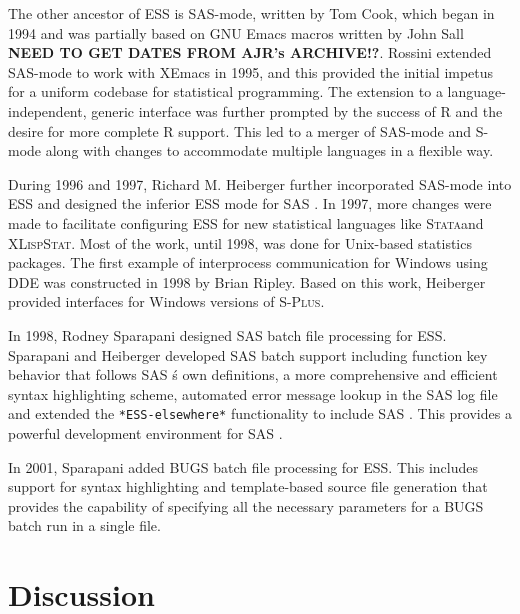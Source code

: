 \documentclass{article}
\newcommand*{\SAS}{\textsc{SAS}{\textregistered} }
\newcommand*{\Splus}{\textsc{S-Plus}}
\newcommand*{\XLispStat}{\textsc{XLispStat}}
\newcommand*{\Stata}{\textsc{Stata}}
\newcommand{\stexttt}[1]{{\small\texttt{#1}}}
\begin{document}
The other ancestor of ESS is SAS-mode,
written by Tom Cook, which began in 1994 and was partially based on
GNU Emacs macros written by John Sall \textbf{NEED TO GET
  DATES FROM AJR's ARCHIVE!?}.  Rossini extended SAS-mode to work with
XEmacs in 1995, and this provided the initial
impetus for a uniform codebase for statistical programming.
The extension to a language-independent, generic interface was further prompted
by the success of R and the desire for more complete R support.  This led to a merger
of SAS-mode and S-mode along with changes 
to accommodate multiple languages in a flexible way.

During 1996 and 1997, Richard M. Heiberger further incorporated
SAS-mode into ESS and designed the inferior ESS mode for \SAS.  In
1997, more changes were made to facilitate  
configuring ESS for new statistical languages like \Stata and \XLispStat.
Most of the work, until 1998, was done for Unix-based statistics packages.
The first example of interprocess communication for Windows using DDE
was constructed in 1998 by Brian Ripley.  Based on this work, Heiberger provided 
interfaces for Windows versions of \Splus.

In 1998, Rodney Sparapani designed \SAS batch file processing for ESS.
Sparapani and Heiberger developed \SAS batch support including function
key behavior that follows \SAS\'s own definitions,
a more comprehensive and efficient syntax highlighting scheme,
automated error message lookup in the \SAS log file and extended the
\stexttt{*ESS-elsewhere*} functionality to include \SAS.  This provides
a powerful development environment for \SAS.

In 2001, Sparapani added BUGS batch file processing for ESS.  This 
includes support for syntax highlighting and template-based source file
generation that provides the capability of specifying all the necessary
parameters for a BUGS batch run in a single file.

\section{Discussion}
\label{sec:discussion}
\end{document}
